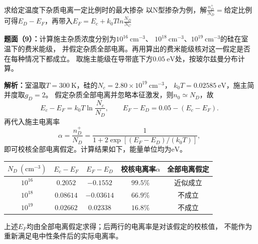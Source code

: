 \begin{note}{求给定温度下杂质电离一定比例时的最大掺杂}
    以N型掺杂为例，解$\frac{n_D^{+}}{N_D}=$给定比例可得$E_D-E_F$，再带入$E_F=E_c+k_0Tln\frac{N_D}{N_C}$
\end{note}

\begin{problem}
    \textbf{题面（9）：}计算施主杂质浓度分别为$10^{16}\ \mathrm{cm}^{-3}$、
    $10^{18}\ \mathrm{cm}^{-3}$、$10^{19}\ \mathrm{cm}^{-3}$的硅在室温下的费米能级，
    并假定杂质全部电离。再用算出的费米能级核对这一假定是否在每种情况下都成立。
    取施主能级在导带底下方$0.05\ \mathrm{eV}$处，按玻尔兹曼分布计算。

    \textbf{解析：}室温取$T=300\ \mathrm{K}$，硅的$N_c=2.80\times10^{19}\ \mathrm{cm}^{-3}$，
    $k_0T=0.02585\ \mathrm{eV}$，施主简并度取$g_D=2$。
    假定杂质全部电离并忽略本征激发，则$n_0\simeq N_D$，故
    \[
    E_c-E_F=k_0T\ln\frac{N_c}{N_D},\qquad
    E_F-E_D=0.05-(E_c-E_F).
    \]
    再代入施主电离率
    \[
    \alpha=\frac{n_D^+}{N_D}
    =\frac{1}{1+2\exp[(E_F-E_D)/(k_0T)]},
    \]
    即可校核全部电离假定。计算结果如下，能量单位均为$\mathrm{eV}$。
    \begin{center}
        \small
        \begin{tabular}{c c c c c}
            \hline
            $N_D\ (\mathrm{cm}^{-3})$ & $E_c-E_F$ & $E_F-E_D$ & 校核电离率$\alpha$ & 全部电离假定 \\
            \hline
            $10^{16}$ & $0.2052$ & $-0.1552$ & $99.5\%$ & 近似成立 \\
            $10^{18}$ & $0.08614$ & $-0.03614$ & $66.9\%$ & 不成立 \\
            $10^{19}$ & $0.02662$ & $0.02338$ & $16.8\%$ & 不成立 \\
            \hline
        \end{tabular}
    \end{center}
    上述$E_F$均由全部电离假定求得；后两行的电离率是对该假定的校核值，
    不能作为重新满足电中性条件后的实际电离率。
\end{problem}

